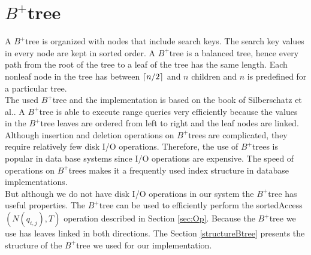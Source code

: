 \documentclass[abstracton,12pt,oneside]{scrreprt}
\DeclarePairedDelimiter\ceil{\lceil}{\rceil}
\begin{document}
\section{$B^+$tree}
\label{sec:BplusTree}
A $B^+$tree is organized with nodes that include search keys. The search key values in every node are kept in sorted order. A $B^+$tree is a balanced tree, hence every path from the root of the tree to a leaf of the tree has the same length. Each nonleaf node in the tree has
between $\ceil{n/2}$ and $n$ children and $n$ is predefined for a particular tree. \\The used $B^+$tree and the implementation is based on the book of Silberschatz et al.\cite{DatabaseSystemC}. A $B^+$tree is able to execute range queries very efficiently because the values in the $B^+$tree leaves are ordered from left to right and the leaf nodes are linked. Although insertion and deletion operations on $B^+$trees are complicated, they
require relatively few disk I/O operations. Therefore, the use of $B^+$trees is popular in data base systems since I/O operations are expensive. The speed of operations on $B^+$trees makes it a frequently used index structure in database implementations.\\
But although we do not have disk I/O operations in our system the $B^+$tree has useful properties. The $B^+$tree can be used to efficiently perform the sortedAccess$(N(q_{i,j}),T)$ operation described in Section \ref{sec:Op}. Because the $B^+$tree we use has leaves linked in both directions. The Section \ref{structureBtree} presents the structure of the $B^+$tree we used for our implementation.
\end{document}
